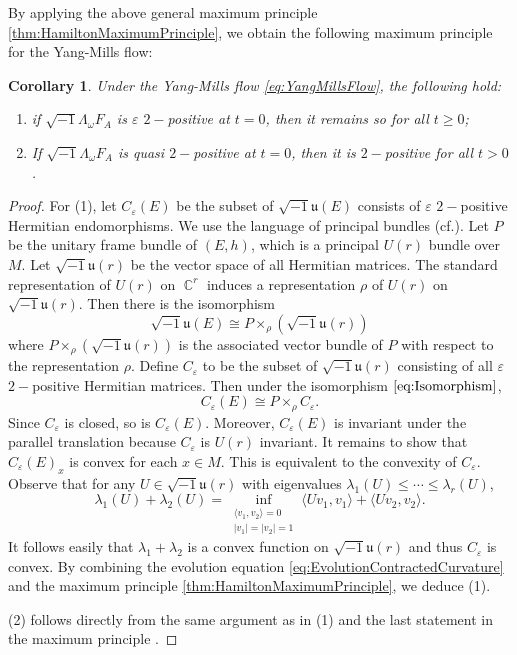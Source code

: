 \documentclass[11pt]{amsart}
\theoremstyle{plain}
\newtheorem{cor}[thm]{Corollary}
\theoremstyle{definition}
\numberwithin{equation}{section}
\DeclareMathOperator{\C}{\mathbb{C}}
\newcommand{\Li}[1]{\mathfrak{#1}}
\begin{document}
By applying the above general maximum principle \ref{thm:HamiltonMaximumPrinciple}, we obtain the following maximum principle for the Yang-Mills flow:
\begin{cor}\label{cor:MaximumPrincipleYangMills}
    Under the Yang-Mills flow \ref{eq:YangMillsFlow}, the following hold:
    \begin{enumerate}
        \item if $\sqrt{-1}\Lambda_\omega F_A$ is $\varepsilon$ $2-$positive at $t=0$, then it remains so for all $t\ge0$;
        \item If $\sqrt{-1}\Lambda_\omega F_A$ is quasi $2-$positive at $t=0$, then it is $2-$positive for all $t>0$.
    \end{enumerate} 
\end{cor}
\begin{proof}
    For (1), let $C_{\varepsilon}(E)$ be the subset of $\sqrt{-1}\Li{u}(E)$ consists of $\varepsilon$ $2-$positive Hermitian endomorphisms. We use the language of principal bundles (cf.\cite[Chapter II]{KN63}). Let $P$ be the unitary frame bundle of $(E,h)$, which is a principal $U(r)$ bundle over $M$. Let $\sqrt{-1}\Li{u}(r)$ be the vector space of all Hermitian matrices. The standard representation of $U(r)$ on $\C^r$ induces a representation $\rho$ of $U(r)$ on $\sqrt{-1}\Li{u}(r)$. Then there is the isomorphism
    \begin{equation}\label{eq:Isomorphism}
        \sqrt{-1}\Li{u}(E)\cong P\times_\rho(\sqrt{-1}\Li{u}(r))
    \end{equation} 
    where $P\times_\rho(\sqrt{-1}\Li{u}(r))$ is the associated vector bundle of $P$ with respect to the representation $\rho$. Define $C_\varepsilon$ to be the subset of $\sqrt{-1}\Li{u}(r)$ consisting of all $\varepsilon$ $2-$positive Hermitian matrices. Then under the isomorphism $\ref{eq:Isomorphism}$,
    \begin{equation}
        C_\varepsilon(E)\cong P\times_\rho C_\varepsilon.
    \end{equation}
    Since $C_\varepsilon$ is closed, so is $C_\varepsilon(E)$. Moreover, $C_\varepsilon(E)$ is invariant under the parallel translation because $C_\varepsilon$ is $U(r)$ invariant. It remains to show that $C_\varepsilon(E)_x$ is convex for each $x\in M$. This is equivalent to the convexity of $C_\varepsilon$. Observe that for any $U\in \sqrt{-1}\Li{u}(r)$ with eigenvalues $\lambda_1(U)\leq\cdots\leq\lambda_r(U)$,
    \[\lambda_1(U)+\lambda_2(U)=\inf_{\substack{\langle v_1,v_2\rangle=0\\|v_1|=|v_2|=1}} \langle Uv_1,v_1\rangle+\langle Uv_2,v_2\rangle.\]
    It follows easily that $\lambda_1+\lambda_2$ is a convex function on $\sqrt{-1}\Li{u}(r)$ and thus $C_\varepsilon$ is convex. By combining the evolution equation \ref{eq:EvolutionContractedCurvature} and the maximum principle \ref{thm:HamiltonMaximumPrinciple}, we deduce (1).

    (2) follows directly from the same argument as in (1) and the last statement in the maximum principle .
\end{proof}
\end{document}
